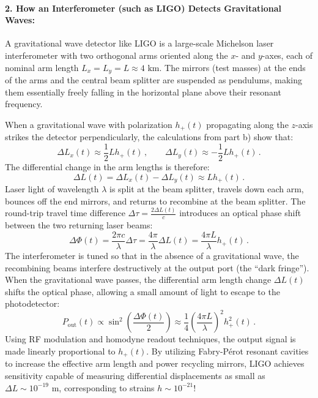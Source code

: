 \documentclass[12pt]{article}
\newcommand{\be}{\begin{equation}}
\newcommand{\ee}{\end{equation}}
\begin{document}
\paragraph{2. How an Interferometer (such as LIGO) Detects Gravitational Waves:}
A gravitational wave detector like LIGO is a large-scale Michelson laser interferometer with two orthogonal arms oriented along the $x$- and $y$-axes, each of nominal arm length $L_x = L_y = L \approx 4\text{ km}$.
The mirrors (test masses) at the ends of the arms and the central beam splitter are suspended as pendulums, making them essentially freely falling in the horizontal plane above their resonant frequency.

When a gravitational wave with polarization $h_+(t)$ propagating along the $z$-axis strikes the detector perpendicularly, the calculations from part b) show that:
\be
\Delta L_x(t) \approx \frac{1}{2} L h_+(t) \,, \qquad \Delta L_y(t) \approx - \frac{1}{2} L h_+(t) \,.
\ee
The differential change in the arm lengths is therefore:
\be
\Delta L(t) = \Delta L_x(t) - \Delta L_y(t) \approx L h_+(t) \,.
\ee
Laser light of wavelength $\lambda$ is split at the beam splitter, travels down each arm, bounces off the end mirrors, and returns to recombine at the beam splitter. The round-trip travel time difference $\Delta \tau = \frac{2 \Delta L(t)}{c}$ introduces an optical phase shift between the two returning laser beams:
\be
\Delta \Phi(t) = \frac{2\pi c}{\lambda} \Delta \tau = \frac{4\pi}{\lambda} \Delta L(t) = \frac{4\pi L}{\lambda} h_+(t) \,.
\ee
The interferometer is tuned so that in the absence of a gravitational wave, the recombining beams interfere destructively at the output port (the ``dark fringe''). When the gravitational wave passes, the differential arm length change $\Delta L(t)$ shifts the optical phase, allowing a small amount of light to escape to the photodetector:
\be
P_{\text{out}}(t) \propto \sin^2\left(\frac{\Delta \Phi(t)}{2}\right) \approx \frac{1}{4} \left(\frac{4\pi L}{\lambda}\right)^2 h_+^2(t) \,.
\ee
Using RF modulation and homodyne readout techniques, the output signal is made linearly proportional to $h_+(t)$. By utilizing Fabry-P\'erot resonant cavities to increase the effective arm length and power recycling mirrors, LIGO achieves sensitivity capable of measuring differential displacements as small as $\Delta L \sim 10^{-19}\text{ m}$, corresponding to strains $h \sim 10^{-21}$!
\end{document}
